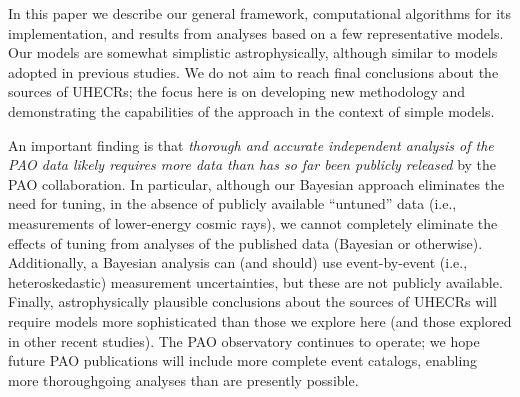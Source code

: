 In this paper we describe our general framework, computational algorithms
for its implementation, and results from analyses based on a few
representative models.  Our models are somewhat simplistic astrophysically,
although similar to models adopted in previous studies.  We do not aim to
reach final conclusions about the sources of UHECRs; the focus here is on
developing new methodology and demonstrating the capabilities of the
approach in the context of simple models.

An important finding is that {\em thorough and accurate independent analysis
of the PAO data likely requires more data than has so far been publicly
released} by the PAO collaboration.  In particular, although our Bayesian
approach eliminates the need for tuning, in the absence of publicly available
``untuned'' data (i.e., measurements of lower-energy cosmic rays), we cannot
completely eliminate the effects of tuning from analyses of the
published data (Bayesian or otherwise).  Additionally, a Bayesian analysis can
(and should) use event-by-event (i.e., heteroskedastic) measurement
uncertainties, but these are not publicly available.  Finally, astrophysically
plausible conclusions about the sources of UHECRs will require models more
sophisticated than those we explore here (and those explored in other recent
studies). The PAO observatory continues to operate; we hope future PAO
publications will include more complete event catalogs, enabling more
thoroughgoing analyses than are presently possible.
